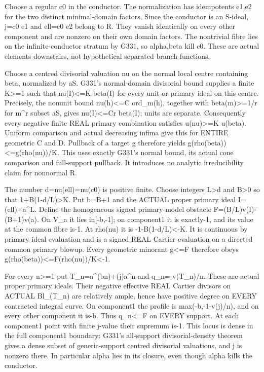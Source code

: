 \documentclass[11pt]{article}
\begin{document}
Choose a regular c0 in the conductor. The normalization has idempotents e1,e2 for the two distinct minimal-domain factors. Since the conductor is an S-ideal, j=c0 e1 and ell=c0 e2 belong to R. They vanish identically on every other component and are nonzero on their own domain factors. The nontrivial fibre lies on the infinite-conductor stratum by G331, so alpha,beta kill c0. These are actual elements downstairs, not hypothetical separated branch functions.

Choose a centred divisorial valuation nu on the normal local centre containing beta, normalized by aS. G331's normal-domain divisorial bound supplies a finite K\textgreater{}=1 such that nu(I)\textless{}=K beta(I) for every unit-or-primary ideal on this centre. Precisely, the nonunit bound nu(h)\textless{}=C ord\_m(h), together with beta(m)\textgreater{}=1/r for m\textasciicircum{}r subset aS, gives nu(I)\textless{}=Cr beta(I); units are separate. Consequently every negative finite REAL primary combination satisfies u(nu)\textgreater{}=K u(beta). Uniform comparison and actual decreasing infima give this for ENTIRE geometric C and D. Pullback of a target g therefore yields g(rho(beta))\textless{}=g(rho(nu))/K. This uses exactly G331's normal bound, its actual cone comparison and full-support pullback. It introduces no analytic irreducibility claim for nonnormal R.

The number d=nu(ell)=nu(c0) is positive finite. Choose integers L\textgreater{}d and B\textgreater{}0 so that 1+B(1-d/L)\textgreater{}K. Put b=B+1 and the ACTUAL proper primary ideal I=(ell)+a\textasciicircum{}L. Define the homogeneous signed primary-model obstacle
F=(B/L)v(I)-(B+1)v(a).
On V\_a it lies in[-b,-1]; on component1 it is exactly-1, and its value at the common fibre is-1. At rho(nu) it is -1-B(1-d/L)\textless{}-K. It is continuous by primary-ideal evaluation and is a signed REAL Cartier evaluation on a directed common primary blowup. Every geometric minorant g\textless{}=F therefore obeys g(rho(beta))\textless{}=F(rho(nu))/K\textless{}-1.

For every n\textgreater{}=1 put T\_n=a\textasciicircum{}(bn)+(j)a\textasciicircum{}n and q\_n=-v(T\_n)/n. These are actual proper primary ideals. Their negative effective REAL Cartier divisors on ACTUAL Bl\_(T\_n) are relatively ample, hence have positive degree on EVERY contracted integral curve. On component1 the profile is max(-b,-1-v(j)/n), and on every other component it is-b. Thus q\_n\textless{}=F on EVERY support. At each component1 point with finite j-value their supremum is-1. This locus is dense in the full component1 boundary: G331's all-support divisorial-density theorem gives a dense subset of generic-support centred divisorial valuations, and j is nonzero there. In particular alpha lies in its closure, even though alpha kills the conductor.
\end{document}

